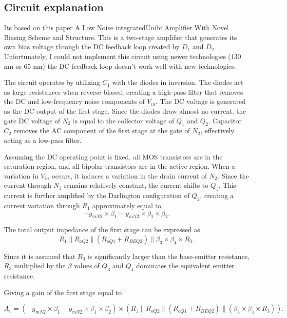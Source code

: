 \documentclass[12pt]{article}
\begin{document}
\subsection{Circuit explanation}
Its based on this paper A Low Noise integratedUnibi Amplifier With Novel Biasing Scheme and Structure.
This is a two-stage amplifier that generates its own bias voltage through the DC feedback loop created by $D_1$ and $D_2$. Unfortunately, I could not implement this circuit using newer technologies (130 nm or 65 nm) the DC feedback loop doesn't work well with new technologies.  

The circuit operates by utilizing $C_1$ with the diodes in inversion. The diodes act as large resistances when reverse-biased, creating a high-pass filter that removes the DC and low-frequency noise components of $V_{in}$. The DC voltage is generated as the DC output of the first stage. Since the diodes draw almost no current, the gate DC voltage of $N_2$ is equal to the collector voltage of $Q_1$ and $Q_2$. Capacitor $C_2$ removes the AC component of the first stage at the gate of $N_2$, effectively acting as a low-pass filter.  

Assuming the DC operating point is fixed, all MOS transistors are in the saturation region, and all bipolar transistors are in the active region. When a variation in $V_{in}$ occurs, it induces a variation in the drain current of $N_2$. Since the current through $N_1$ remains relatively constant, the current shifts to $Q_1$. This current is further amplified by the Darlington configuration of $Q_2$, creating a current variation through $R_1$ approximately equal to
\[
-g_{mN2} \times \beta_1 - g_{mN2} \times \beta_1 \times \beta_2.
\]  

The total output impedance of the first stage can be expressed as
\[
R_1 \parallel R_{oQ2} \parallel (R_{oQ1} + R_{BEQ2}) \parallel \beta_3 \times \beta_4 \times R_3.
\]  

Since it is assumed that $R_3$ is significantly larger than the base-emitter resistance, $R_3$ multiplied by the $\beta$ values of $Q_3$ and $Q_4$ dominates the equivalent emitter resistance. 

Giving a gain of the first stage equal to

\begin{equation}
    A_v = (-g_{mN2} \times \beta_1 - g_{mN2} \times \beta_1 \times \beta_2) \times (R_1 \parallel R_{oQ2} \parallel (R_{oQ1} + R_{BEQ2}) \parallel( \beta_3 \times \beta_4 \times R_3)).
\end{equation}
\end{document}
